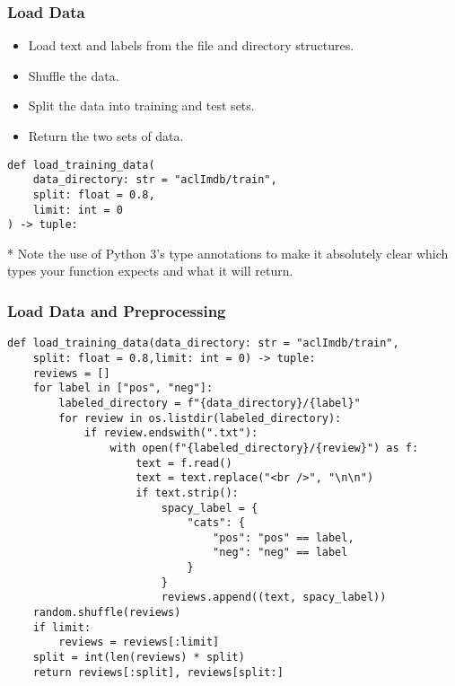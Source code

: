 \begin{frame}[fragile]\frametitle{Load Data}

\begin{itemize}
\item Load text and labels from the file and directory structures.
\item Shuffle the data.
\item Split the data into training and test sets.
\item Return the two sets of data.
\end{itemize}


\begin{lstlisting}
def load_training_data(
    data_directory: str = "aclImdb/train",
    split: float = 0.8,
    limit: int = 0
) -> tuple:
\end{lstlisting}

* Note the use of Python 3’s type annotations to make it absolutely clear which types your function expects and what it will return.

\end{frame}

\begin{frame}[fragile]\frametitle{Load Data and Preprocessing}

\begin{lstlisting}
def load_training_data(data_directory: str = "aclImdb/train",
    split: float = 0.8,limit: int = 0) -> tuple:
    reviews = []
    for label in ["pos", "neg"]:
        labeled_directory = f"{data_directory}/{label}"
        for review in os.listdir(labeled_directory):
            if review.endswith(".txt"):
                with open(f"{labeled_directory}/{review}") as f:
                    text = f.read()
                    text = text.replace("<br />", "\n\n")
                    if text.strip():
                        spacy_label = {
                            "cats": {
                                "pos": "pos" == label,
                                "neg": "neg" == label
                            }
                        }
                        reviews.append((text, spacy_label))
    random.shuffle(reviews)
    if limit:
        reviews = reviews[:limit]
    split = int(len(reviews) * split)
    return reviews[:split], reviews[split:]												
\end{lstlisting}

\end{frame}

